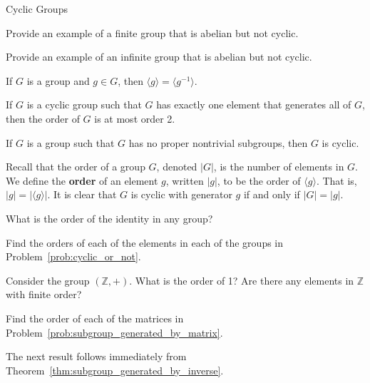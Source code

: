 \begin{section}{Cyclic Groups}
\begin{problem}
Provide an example of a finite group that is abelian but not cyclic.
\end{problem}

\begin{problem}
Provide an example of an infinite group that is abelian but not cyclic.
\end{problem}

\begin{theorem}\label{thm:subgroup_generated_by_inverse}
If $G$ is a group and $g\in G$, then $\langle g\rangle=\langle g^{-1}\rangle$.
\end{theorem}

\begin{theorem}
If $G$ is a cyclic group such that $G$ has exactly one element that generates all of $G$, then the order of $G$ is at most order 2.   
\end{theorem}

\begin{theorem}
If $G$ is a group such that $G$ has no proper nontrivial subgroups, then $G$ is cyclic.
\end{theorem}

Recall that the order of a group $G$, denoted $|G|$, is the number of elements in $G$. We define the \textbf{order} of an element $g$, written $|g|$, to be the order of $\langle g\rangle$.  That is, $|g|=|\langle g\rangle|$.  It is clear that $G$ is cyclic with generator $g$ if and only if $|G|=|g|$.

\begin{problem}
What is the order of the identity in any group?
\end{problem}

\begin{problem}\label{prob:computing_orders}
Find the orders of each of the elements in each of the groups in Problem~\ref{prob:cyclic_or_not}.
\end{problem}

\begin{problem}
Consider the group $(\mathbb{Z},+)$.  What is the order of 1?  Are there any elements in $\mathbb{Z}$ with finite order?
\end{problem}

\begin{problem}
Find the order of each of the matrices in Problem~\ref{prob:subgroup_generated_by_matrix}.
\end{problem}

The next result follows immediately from Theorem~\ref{thm:subgroup_generated_by_inverse}.


\end{section}

